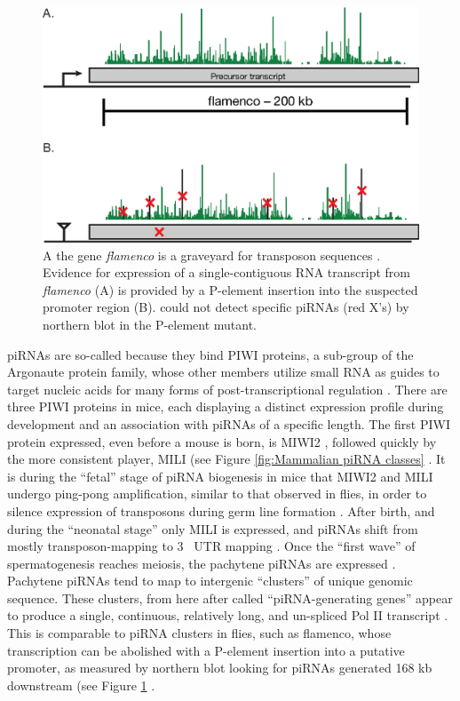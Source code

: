       \begin{figure}[htbp] %
      \centering 
      \includegraphics{Figures/Chapter1/FlamencoLocus.eps}
      \caption[Genetic evidence for long, continuous fly piRNA precursor transcripts]
      {
        A the \flies{} gene \textit{flamenco} is a graveyard for transposon sequences \citep{Pelisson1994}. Evidence for expression of a single-contiguous RNA transcript from \textit{flamenco} (A) is provided by a P-element insertion into the suspected promoter region (B). \citep{Brennecke2007} could not detect specific piRNAs (red X's) by northern blot in the P-element mutant.
        }
      \label{fig:flamenco}
      \end{figure}

      piRNAs are so-called because they bind PIWI proteins, a sub-group of the Argonaute protein family, whose other members utilize small RNA as guides to target nucleic acids for many forms of post-transcriptional regulation \citep{Siomi2011}. There are three PIWI proteins in mice, each displaying a distinct expression profile during development and an association with piRNAs of a specific length. The first PIWI protein expressed, even before a mouse is born, is MIWI2 \citep{Carmell2007}, followed quickly by the more consistent player, MILI (see Figure \ref{fig:Mammalian piRNA classes} \citep{Kuramochi-Miyagawa2004, Aravin2006}. It is during the ``fetal'' stage of piRNA biogenesis in mice that MIWI2 and MILI undergo ping-pong amplification, similar to that observed in flies, in order to silence expression of transposons during germ line formation \citep{Brennecke2007, Kuramochi-Miyagawa2008}. After birth, and during the ``neonatal stage'' only MILI is expressed, and piRNAs shift from mostly transposon-mapping to 3\textprime~ UTR mapping \citep{Robine2009}. Once the ``first wave'' of spermatogenesis \citep{Oakberg1956b, Laiho2013a} reaches meiosis, the pachytene piRNAs are expressed \citep{Girard2006, Lau2006, Li2013h}. Pachytene piRNAs tend to map to intergenic ``clusters'' of unique genomic sequence. These clusters, from here after called ``piRNA-generating genes'' appear to produce a single, continuous, relatively long, and un-spliced Pol II transcript \citep{Li2013h}. This is comparable to piRNA clusters in flies, such as flamenco, whose transcription can be abolished with a P-element insertion into a putative promoter, as measured by northern blot looking for piRNAs generated 168 kb downstream (see Figure \ref{fig:flamenco} \citep{Brennecke2007}. 


